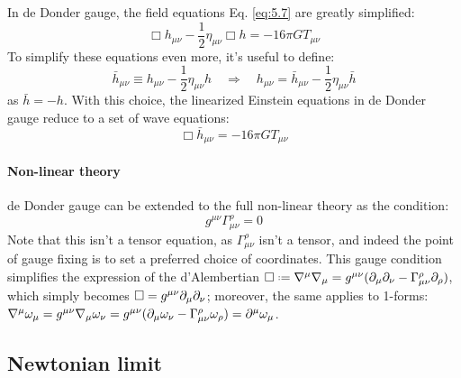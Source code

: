 In de Donder gauge, the field equations Eq. \ref{eq:5.7} are greatly simplified:
\begin{equation}
  \Box h_{\mu \nu} - \frac{1}{2} \eta_{\mu \nu} \Box h = -16\pi G T_{\mu \nu}
  \label{eq:5.11}
\end{equation}
To simplify these equations even more, it's useful to define:
\begin{equation*}
  \bar{h}_{\mu \nu} \equiv h_{\mu \nu} - \frac{1}{2} \eta_{\mu \nu} h
  \quad \Rightarrow \quad
  h_{\mu \nu} = \bar{h}_{\mu \nu} - \frac{1}{2} \eta_{\mu \nu} \bar{h}
\end{equation*}
as $ \bar{h} = - h $. With this choice, the linearized Einstein equations in de Donder gauge reduce to a set of wave equations:
\begin{equation}
  \Box \bar{h}_{\mu \nu} = -16\pi G T_{\mu \nu}
  \label{eq:5.12}
\end{equation}

\paragraph{Non-linear theory}

de Donder gauge can be extended to the full non-linear theory as the condition:
\begin{equation}
  g^{\mu \nu} \Gamma^\rho_{\mu \nu} = 0
  \label{eq:5.13}
\end{equation}
Note that this isn't a tensor equation, as $ \Gamma^\rho_{\mu \nu} $ isn't a tensor, and indeed the point of gauge fixing is to set a preferred choice of coordinates. This gauge condition simplifies the expression of the d'Alembertian $ \Box \defeq \na^\mu \na_\mu = g^{\mu \nu} ( \pa_\mu \pa_\nu - \Gamma^\rho_{\mu \nu} \pa_\rho ) $, which simply becomes $ \Box = g^{\mu \nu} \partial_\mu \partial_\nu $; moreover, the same applies to 1-forms: $ \nabla^\mu \omega_\mu = g^{\mu \nu} \nabla_\mu \omega_\nu = g^{\mu \nu} ( \partial_\mu \omega _\nu - \Gamma^\rho_{\mu \nu} \omega_\rho ) = \partial^\mu \omega_\mu $.

\subsection{Newtonian limit}

